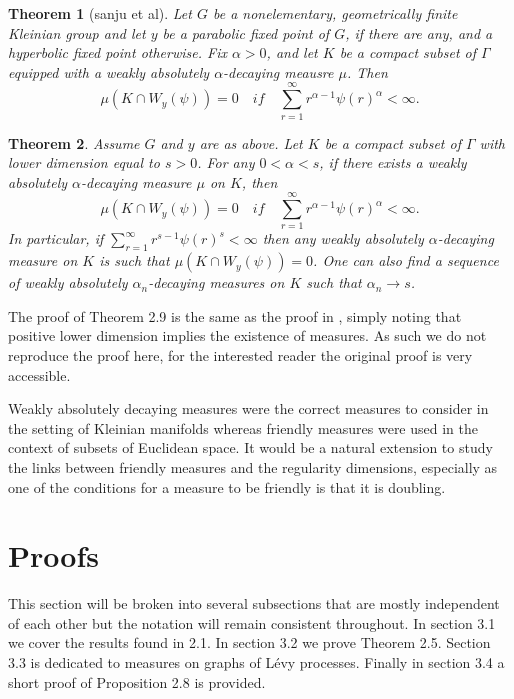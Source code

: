 \documentclass[12pt]{amsart}
\numberwithin{equation}{section}
\newtheorem{thm}{Theorem}[section]
\begin{document}
\begin{thm}[sanju et al]
Let $G$ be a nonelementary, geometrically finite Kleinian group and let $y$ be a parabolic fixed point of $G$, if there are any, and a hyperbolic fixed point otherwise. Fix $\alpha > 0$, and let $K$ be a compact subset of $\Gamma$ equipped with a weakly absolutely $\alpha$-decaying meausre $\mu$. Then
\[
\mu(K\cap W_y(\psi)) = 0 \quad if \quad \sum_{r=1}^\infty r^{\alpha-1} \psi(r)^{\alpha} < \infty.
\]
\end{thm}

\begin{thm}
Assume $G$ and $y$ are as above. Let $K$ be a compact subset of $\Gamma$ with lower dimension equal to $s > 0$. For any $0 < \alpha < s$, if there exists a weakly absolutely $\alpha$-decaying measure $\mu$ on $K$, then
\[
\mu(K\cap W_y(\psi)) = 0 \quad if \quad \sum_{r=1}^\infty r^{\alpha-1} \psi(r)^{\alpha} < \infty.
\]
In particular, if  $\sum_{r=1}^\infty r^{s-1} \psi(r)^{s} < \infty$ then any weakly absolutely $\alpha$-decaying measure on $K$ is such that $\mu(K\cap W_y(\psi)) = 0$. One can also find a sequence of weakly absolutely $\alpha_n$-decaying measures on $K$ such that $\alpha_n \rightarrow s$. 
\end{thm}

The proof of Theorem 2.9 is the same as the proof in \cite{sanju et al}, simply noting that positive lower dimension implies the existence of measures. As such we do not reproduce the proof here, for the interested reader the original proof is very accessible.

Weakly absolutely decaying measures were the correct measures to consider in the setting of Kleinian manifolds whereas friendly measures were used in the context of subsets of Euclidean space. It would be a natural extension to study the links between friendly measures and the regularity dimensions, especially as one of the conditions for a measure to be friendly is that it is doubling.  


\section{Proofs}

This section will be broken into several subsections that are mostly independent of each other but the notation will remain consistent throughout. In section 3.1 we cover the results found in 2.1. In section 3.2 we prove Theorem 2.5. Section 3.3 is dedicated to measures on graphs of L\'evy processes. Finally in section 3.4 a short proof of Proposition 2.8 is provided.
\end{document}
